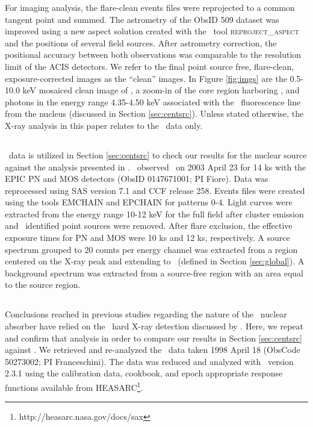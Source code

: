 \documentclass[useAMS,usenatbib]{mn2e}
\begin{document}
For imaging analysis, the flare-clean events files were reprojected to
a common tangent point and summed. The astrometry of the ObsID 509
dataset was improved using a new aspect solution created with the
\ciao\ tool {\textsc{reproject\_aspect}} and the positions of several
field sources. After astrometry correction, the positional accuracy
between both observations was comparable to the resolution limit of
the ACIS detectors. We refer to the final point source free,
flare-clean, exposure-corrected images as the ``clean'' images. In
Figure \ref{fig:imgs} are the 0.5-10.0 keV mosaiced clean image of
\rxj, a zoom-in of the core region harboring \irs, and photons in the
energy range 4.35-4.50 keV associated with the \feka\ fluorescence
line from the nucleus (discussed in Section \ref{sec:centsrc}). Unless
stated otherwise, the X-ray analysis in this paper relates to the
\chandra\ data only.

\subsection{\xmm}
\label{sec:xmm}

\xmm\ data is utilized in Section \ref{sec:centsrc} to check our
results for the nuclear source against the analysis presented in
\citet{2007A&A...473...85P}. \xmm\ observed \irs\ on 2003 April 23 for
14 ks with the EPIC PN and MOS detectors (ObsID 0147671001; PI
Fiore). Data was reprocessed using SAS version 7.1 and CCF release
258. Events files were created using the tools {\textsc{EMCHAIN}} and
{\textsc{EPCHAIN}} for patterns 0-4. Light curves were extracted from
the energy range 10-12 keV for the full field after cluster emission
and \chandra\ identified point sources were removed. After flare
exclusion, the effective exposure times for PN and MOS were 10 ks and
12 ks, respectively. A source spectrum grouped to 20 counts per energy
channel was extracted from a region centered on the X-ray peak and
extending to \rf\ (defined in Section \ref{sec:global}). A background
spectrum was extracted from a source-free region with an area equal to
the source region.

\subsection{\bepposax}
\label{sec:beppo}

Conclusions reached in previous studies regarding the nature of the
\irs\ nuclear absorber have relied on the \bepposax\ hard X-ray
detection discussed by \citet{2000A&A...353..910F}. Here, we repeat
and confirm that analysis in order to compare our results in Section
\ref{sec:centsrc} against \citet{2000A&A...353..910F}. We retrieved
and re-analyzed the \bepposax\ data taken 1998 April 18 (ObsCode
50273002; PI Franceschini). The data was reduced and analyzed with
\saxdas\ version 2.3.1 using the calibration data, cookbook, and epoch
appropriate response functions available from
HEASARC\footnote{http://heasarc.nasa.gov/docs/sax}.
\end{document}
